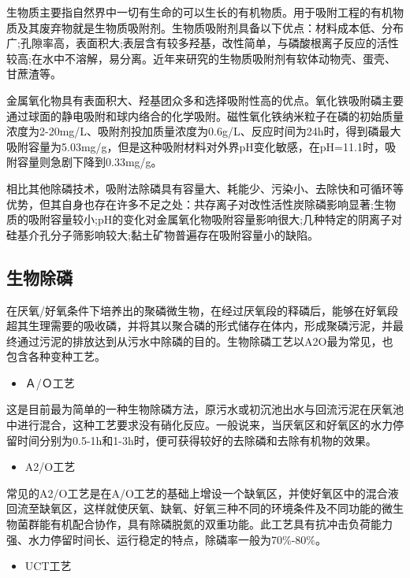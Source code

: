 \documentclass[]{book}
\providecommand{\tightlist}{%
  \setlength{\itemsep}{0pt}\setlength{\parskip}{0pt}}
\begin{document}
生物质主要指自然界中一切有生命的可以生长的有机物质。用于吸附工程的有机物质及其废弃物就是生物质吸附剂。生物质吸附剂具备以下优点：材料成本低、分布广;孔隙率高，表面积大;表层含有较多羟基，改性简单，与磷酸根离子反应的活性较高;在水中不溶解，易分离。近年来研究的生物质吸附剂有软体动物壳、蛋壳、甘蔗渣等。

金属氧化物具有表面积大、羟基团众多和选择吸附性高的优点。氧化铁吸附磷主要通过球面的静电吸附和球内络合的化学吸附。磁性氧化铁纳米粒子在磷的初始质量浓度为2-20mg/L、吸附剂投加质量浓度为0.6g/L、反应时间为24h时，得到磷最大吸附容量为5.03mg/g，但是这种吸附材料对外界pH变化敏感，在pH=11.1时，吸附容量则急剧下降到0.33mg/g。

相比其他除磷技术，吸附法除磷具有容量大、耗能少、污染小、去除快和可循环等优势，但其自身也存在许多不足之处：共存离子对改性活性炭除磷影响显著;生物质的吸附容量较小;pH的变化对金属氧化物吸附容量影响很大;几种特定的阴离子对硅基介孔分子筛影响较大;黏土矿物普遍存在吸附容量小的缺陷。

\hypertarget{ux751fux7269ux9664ux78f7}{%
\subsection{生物除磷}\label{ux751fux7269ux9664ux78f7}}

在厌氧/好氧条件下培养出的聚磷微生物，在经过厌氧段的释磷后，能够在好氧段超其生理需要的吸收磷，并将其以聚合磷的形式储存在体内，形成聚磷污泥，并最终通过污泥的排放达到从污水中除磷的目的。生物除磷工艺以A2O最为常见，也包含各种变种工艺。

\begin{itemize}
\tightlist
\item
  Ａ/Ｏ工艺
\end{itemize}

这是目前最为简单的一种生物除磷方法，原污水或初沉池出水与回流污泥在厌氧池中进行混合，这种工艺要求没有硝化反应。一般说来，当厌氧区和好氧区的水力停留时间分别为0.5-1h和1-3h时，便可获得较好的去除磷和去除有机物的效果。

\begin{itemize}
\tightlist
\item
  A2/O工艺
\end{itemize}

常见的A2/O工艺是在A/O工艺的基础上增设一个缺氧区，并使好氧区中的混合液回流至缺氧区，这样就使厌氧、缺氧、好氧三种不同的环境条件及不同功能的微生物菌群能有机配合协作，具有除磷脱氮的双重功能。此工艺具有抗冲击负荷能力强、水力停留时间长、运行稳定的特点，除磷率一般为70\%-80\%。

\begin{itemize}
\tightlist
\item
  UCT工艺
\end{itemize}
\end{document}
